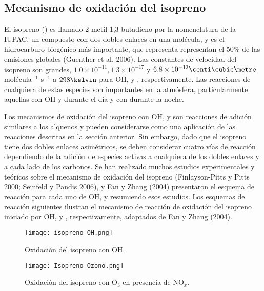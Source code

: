 {\subsection{Mecanismo de oxidaci\'on del isopreno}
El isopreno () es llamado 2-metil-1,3-butadieno por la nomenclatura de la IUPAC, un compuesto con dos dobles enlaces en una molécula, y es el hidrocarburo biogénico más importante, que representa representan el 50\% de las emisiones globales (Guenther et al. 2006). Las constantes de velocidad del isopreno son grandes, $1.0\times10^{-11}, 1.3\times10^{-17} $ y $6.8\times10^{-13} \centi\cubic\metre$  molécula$^{-1}$ s$^{-1}$ a $298\kelvin$ para OH,  y , respectivamente. Las reacciones de cualquiera de estas especies son importantes en la atmósfera, particularmente aquellas con OH y  durante el día y con  durante la noche.

Los mecanismos de oxidación del isopreno con OH,  y  son reacciones de adición similares a los alquenos y pueden considerarse como una aplicación de las reacciones descritas en la sección anterior. Sin embargo, dado que el isopreno tiene dos dobles enlaces asimétricos, se deben considerar cuatro vías de reacción dependiendo de la adición de especies activas a cualquiera de los dobles enlaces y a cada lado de los carbonos. Se han realizado muchos estudios experimentales y teóricos sobre el mecanismo de oxidación del isopreno (Finlayson-Pitts y Pitts 2000; Seinfeld y Pandis 2006), y Fan y Zhang (2004) presentaron el esquema de reacción para cada uno de OH,  y  resumiendo esos estudios. Los esquemas de reacción siguientes  ilustran el mecanismo de reacción de oxidación del isopreno iniciado por OH,  y , respectivamente, adaptados de Fan y Zhang (2004).

\begin{figure}[htbp]
\begin{center}
\texttt{[image: isopreno-OH.png]}
\caption{Oxidación del isopreno con OH.}
\label{isopOH}
\end{center}
\end{figure}

\begin{figure}[htbp]
\begin{center}
\texttt{[image: Isopreno-Ozono.png]}
\caption{Oxidación del isopreno con O$_3$ en presencia de NO$_x$.}
\label{isopO3}
\end{center}
\end{figure}
 
}
